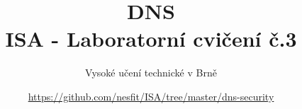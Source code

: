 \documentclass[a4paper,11pt]{article}
\title{DNS\\
{\bf\large ISA - Laboratorní cvičení č.3}}
\author{Vysoké učení technické v Brně}
\date{\url{https://github.com/nesfit/ISA/tree/master/dns-security}}
\begin{document}
{\let\newpage\relax\maketitle}


\end{document}
